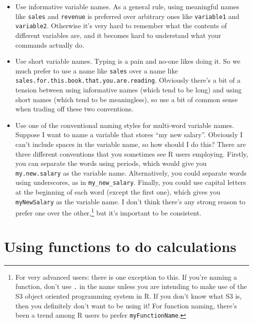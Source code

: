 \documentclass[
]{book}
\providecommand{\tightlist}{%
  \setlength{\itemsep}{0pt}\setlength{\parskip}{0pt}}
\begin{document}
\begin{itemize}
\tightlist
\item
  Use informative variable names. As a general rule, using meaningful names like \texttt{sales} and \texttt{revenue} is preferred over arbitrary ones like \texttt{variable1} and \texttt{variable2}. Otherwise it's very hard to remember what the contents of different variables are, and it becomes hard to understand what your commands actually do.
\item
  Use short variable names. Typing is a pain and no-one likes doing it. So we much prefer to use a name like \texttt{sales} over a name like \texttt{sales.for.this.book.that.you.are.reading}. Obviously there's a bit of a tension between using informative names (which tend to be long) and using short names (which tend to be meaningless), so use a bit of common sense when trading off these two conventions.
\item
  Use one of the conventional naming styles for multi-word variable names. Suppose I want to name a variable that stores ``my new salary''. Obviously I can't include spaces in the variable name, so how should I do this? There are three different conventions that you sometimes see R users employing. Firstly, you can separate the words using periods, which would give you \texttt{my.new.salary} as the variable name. Alternatively, you could separate words using underscores, as in \texttt{my\_new\_salary}. Finally, you could use capital letters at the beginning of each word (except the first one), which gives you \texttt{myNewSalary} as the variable name. I don't think there's any strong reason to prefer one over the other,\footnote{For very advanced users: there is one exception to this. If you're naming a function, don't use \texttt{.} in the name unless you are intending to make use of the S3 object oriented programming system in R. If you don't know what S3 is, then you definitely don't want to be using it! For function naming, there's been a trend among R users to prefer \texttt{myFunctionName}.} but it's important to be consistent.
\end{itemize}

\hypertarget{usingfunctions}{%
\section{Using functions to do calculations}\label{usingfunctions}}
\end{document}
